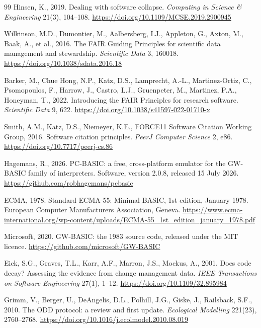 \begin{thebibliography}{99}
Hinsen, K., 2019. Dealing with software collapse. \emph{Computing in Science \& Engineering} 21(3), 104--108. \url{https://doi.org/10.1109/MCSE.2019.2900945}

Wilkinson, M.D., Dumontier, M., Aalbersberg, I.J., Appleton, G., Axton, M., Baak, A., et al., 2016. The FAIR Guiding Principles for scientific data management and stewardship. \emph{Scientific Data} 3, 160018. \url{https://doi.org/10.1038/sdata.2016.18}

Barker, M., Chue Hong, N.P., Katz, D.S., Lamprecht, A.-L., Martinez-Ortiz, C., Psomopoulos, F., Harrow, J., Castro, L.J., Gruenpeter, M., Martinez, P.A., Honeyman, T., 2022. Introducing the FAIR Principles for research software. \emph{Scientific Data} 9, 622. \url{https://doi.org/10.1038/s41597-022-01710-x}

Smith, A.M., Katz, D.S., Niemeyer, K.E., FORCE11 Software Citation Working Group, 2016. Software citation principles. \emph{PeerJ Computer Science} 2, e86. \url{https://doi.org/10.7717/peerj-cs.86}

Hagemans, R., 2026. PC-BASIC: a free, cross-platform emulator for the GW-BASIC family of interpreters. Software, version 2.0.8, released 15 July 2026. \url{https://github.com/robhagemans/pcbasic}

ECMA, 1978. Standard ECMA-55: Minimal BASIC, 1st edition, January 1978. European Computer Manufacturers Association, Geneva. \url{https://www.ecma-international.org/wp-content/uploads/ECMA-55_1st_edition_january_1978.pdf}

Microsoft, 2020. GW-BASIC: the 1983 source code, released under the MIT licence. \url{https://github.com/microsoft/GW-BASIC}

Eick, S.G., Graves, T.L., Karr, A.F., Marron, J.S., Mockus, A., 2001. Does code decay? Assessing the evidence from change management data. \emph{IEEE Transactions on Software Engineering} 27(1), 1--12. \url{https://doi.org/10.1109/32.895984}

Grimm, V., Berger, U., DeAngelis, D.L., Polhill, J.G., Giske, J., Railsback, S.F., 2010. The ODD protocol: a review and first update. \emph{Ecological Modelling} 221(23), 2760--2768. \url{https://doi.org/10.1016/j.ecolmodel.2010.08.019}


\end{thebibliography}
